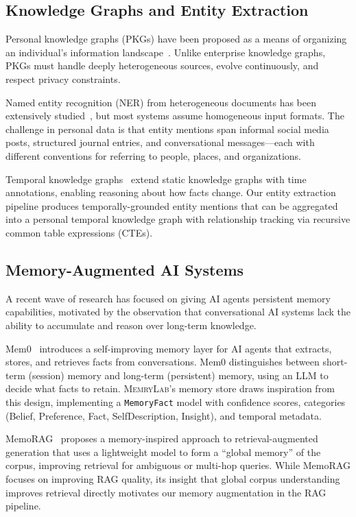 \documentclass[manuscript,review]{acmart}
\begin{document}
\subsection{Knowledge Graphs and Entity Extraction}
\label{sec:related-kg}

Personal knowledge graphs (PKGs) have been proposed as a means of organizing an individual's information landscape~\cite{balog2019personal,Kejriwal2022knowledge}.
Unlike enterprise knowledge graphs, PKGs must handle deeply heterogeneous sources, evolve continuously, and respect privacy constraints.

Named entity recognition (NER) from heterogeneous documents has been extensively studied~\cite{li2020survey,yadav2018ner}, but most systems assume homogeneous input formats.
The challenge in personal data is that entity mentions span informal social media posts, structured journal entries, and conversational messages---each with different conventions for referring to people, places, and organizations.

Temporal knowledge graphs~\cite{jiang2024tkg_survey,leblay2018temporal} extend static knowledge graphs with time annotations, enabling reasoning about how facts change.
Our entity extraction pipeline produces temporally-grounded entity mentions that can be aggregated into a personal temporal knowledge graph with relationship tracking via recursive common table expressions (CTEs).

\subsection{Memory-Augmented AI Systems}
\label{sec:related-memory}

A recent wave of research has focused on giving AI agents persistent memory capabilities, motivated by the observation that conversational AI systems lack the ability to accumulate and reason over long-term knowledge.

Mem0~\cite{chhikara2025mem0} introduces a self-improving memory layer for AI agents that extracts, stores, and retrieves facts from conversations.
Mem0 distinguishes between short-term (session) memory and long-term (persistent) memory, using an LLM to decide what facts to retain.
\textsc{MemryLab}'s memory store draws inspiration from this design, implementing a \texttt{MemoryFact} model with confidence scores, categories (Belief, Preference, Fact, SelfDescription, Insight), and temporal metadata.

MemoRAG~\cite{qian2024memorag} proposes a memory-inspired approach to retrieval-augmented generation that uses a lightweight model to form a ``global memory'' of the corpus, improving retrieval for ambiguous or multi-hop queries.
While MemoRAG focuses on improving RAG quality, its insight that global corpus understanding improves retrieval directly motivates our memory augmentation in the RAG pipeline.
\end{document}
